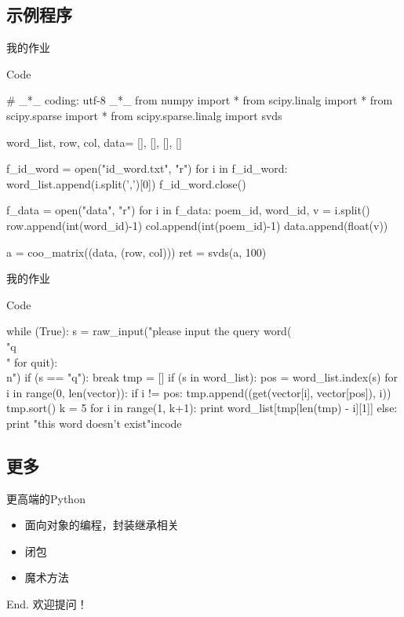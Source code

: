 \documentclass[xcolor=dvipsnames, 9pt]{beamer}
\newenvironment{code}{\begin{semiverbatim} \begin{footnotesize}}{\end{footnotesize}\end{semiverbatim}}
\begin{document}
\subsection{示例程序}

\begin{frame}[fragile]{我的作业}
	\begin{block}{Code}\begin{code}
# \_*\_ coding: utf-8 \_*\_
from numpy import *
from scipy.linalg import *
from scipy.sparse import *
from scipy.sparse.linalg import svds

word\_list, row, col, data= [], [], [], []

f\_id\_word = open("id\_word.txt", "r")
for i in f\_id\_word:
	word\_list.append(i.split(',')[0])
f\_id\_word.close()

f\_data = open("data", "r")
for i in f\_data:
	poem\_id, word\_id, v = i.split()
	row.append(int(word\_id)-1)
	col.append(int(poem\_id)-1)
	data.append(float(v))

a = coo\_matrix((data, (row, col)))
ret = svds(a, 100)
	\end{code}\end{block}
\end{frame}

\begin{frame}[fragile]{我的作业}
	\begin{block}{Code}\begin{code}
while (True):
    s = raw\_input("please input the query word(\\"q\\" for quit):\\n")
    if (s == "q"): break
    tmp = []
    if (s in word\_list):
        pos = word\_list.index(s)
        for i in range(0, len(vector)):
            if i != pos:
                tmp.append((get(vector[i], vector[pos]), i))
        tmp.sort()
        k = 5
        for i in range(1, k+1):
            print word\_list[tmp[len(tmp) - i][1]]
    else:
        print "this word doesn't exist"in{code}
	\end{code}\end{block}
\end{frame}

\subsection{更多}
\begin{frame}{更高端的Python}
	\begin{itemize}
		\item<2-> 面向对象的编程，封装继承相关
			\vspace{0.1cm}
		\item<3-> 闭包
			\vspace{0.1cm}
		\item<4-> 魔术方法
	\end{itemize}
\end{frame}

\begin{frame}{End.}
	\huge{欢迎提问！}
\end{frame}
\end{document}
